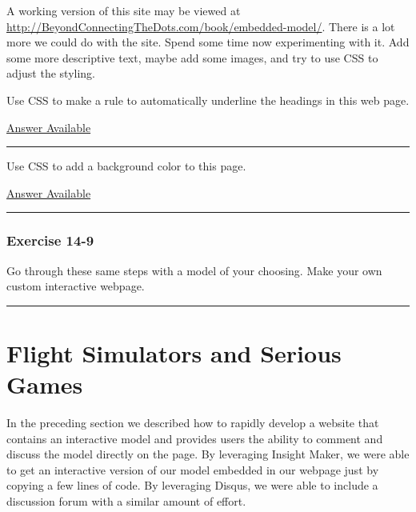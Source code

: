 \documentclass[]{memoir}
\begin{document}
A working version of this site may be viewed at
\url{http://BeyondConnectingTheDots.com/book/embedded-model/}. There is
a lot more we could do with the site. Spend some time now experimenting
with it. Add some more descriptive text, maybe add some images, and try
to use CSS to adjust the styling.


Use CSS to make a rule to automatically underline the headings in this
web page.

\hyperref[Ans-14-7]{Answer Available}

\begin{center}\rule{3in}{0.4pt}\end{center}


Use CSS to add a background color to this page.

\hyperref[Ans-14-8]{Answer Available}

\begin{center}\rule{3in}{0.4pt}\end{center}

\subsubsection{Exercise 14-9}

Go through these same steps with a model of your choosing. Make your own
custom interactive webpage.

\begin{center}\rule{3in}{0.4pt}\end{center}

\section{Flight Simulators and Serious Games}

In the preceding section we described how to rapidly develop a website
that contains an interactive model and provides users the ability to
comment and discuss the model directly on the page. By leveraging
Insight Maker, we were able to get an interactive version of our model
embedded in our webpage just by copying a few lines of code. By
leveraging Disqus, we were able to include a discussion forum with a
similar amount of effort.
\end{document}
